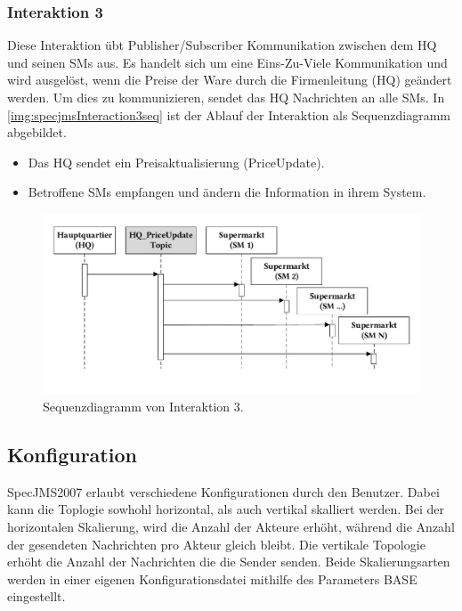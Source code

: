\subsubsection{Interaktion 3}
\label{sec:interaction3desc}
Diese Interaktion übt Publisher/Subscriber Kommunikation zwischen dem HQ und seinen SMs aus. Es handelt sich um eine Eins-Zu-Viele Kommunikation und wird ausgelöst, wenn die Preise der Ware durch die Firmenleitung (HQ) geändert werden. Um dies zu kommunizieren, sendet das HQ Nachrichten an alle SMs. In \autoref{img:specjmsInteraction3seq} ist der Ablauf der Interaktion als Sequenzdiagramm abgebildet.
\begin{itemize}
    \item Das HQ sendet ein Preisaktualisierung (PriceUpdate).
    \item Betroffene SMs empfangen und ändern die Information in ihrem System.
\end{itemize}


\begin{figure}
\center
  \includegraphics[width=1\textwidth]{images/evaluation/specjms/evaluationInteraktion3seq.pdf}
  \caption{Sequenzdiagramm von Interaktion 3.}
  \label{img:specjmsInteraction3seq}
\end{figure}


\subsection{Konfiguration}
SpecJMS2007 erlaubt verschiedene Konfigurationen durch den Benutzer. Dabei kann die Toplogie sowhohl horizontal, als auch vertikal skalliert werden. Bei der horizontalen Skalierung, wird die Anzahl der Akteure erhöht, während die Anzahl der gesendeten Nachrichten pro Akteur gleich bleibt. Die vertikale Topologie erhöht die Anzahl der Nachrichten die die Sender senden. Beide Skalierungsarten werden in einer eigenen Konfigurationsdatei mithilfe des Parameters BASE eingestellt.

